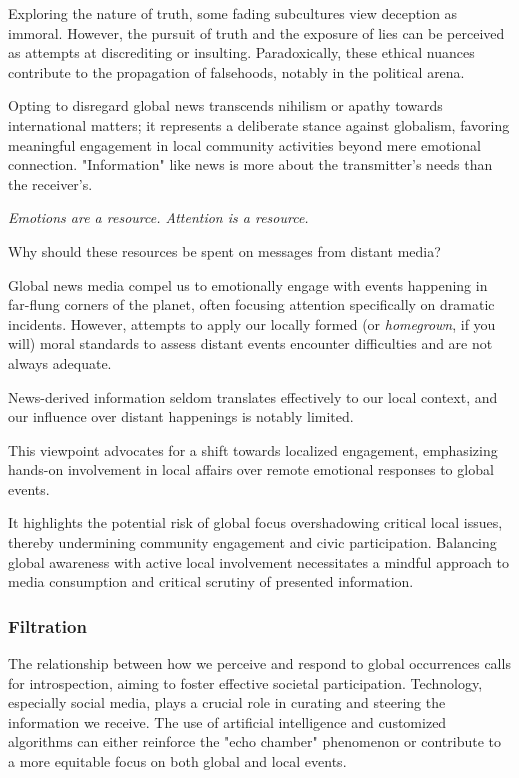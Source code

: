 \documentclass[11pt,a4]{article}
\begin{document}
    Exploring the nature of truth, some fading subcultures view deception as immoral. However, the pursuit of truth and the exposure of lies can be perceived as attempts at discrediting or insulting. Paradoxically, these ethical nuances contribute to the propagation of falsehoods, notably in the political arena.


    Opting to disregard global news transcends nihilism or apathy
    towards international matters; it represents a deliberate stance
    against globalism, favoring meaningful engagement in local community
    activities beyond mere emotional connection.    "Information" like
    news is  more about the transmitter's needs than the receiver's.

    \textit{Emotions are a resource. Attention is a resource.}

    Why should these resources be spent on messages from distant media?

    Global news media compel us to emotionally engage with events happening in far-flung corners of the planet, often focusing attention specifically on dramatic incidents. However, attempts to apply our locally formed (or \textit{homegrown}, if you will) moral standards to assess distant events encounter difficulties and are not always adequate.

    News-derived information seldom translates effectively to our
    local context, and our influence over distant happenings is notably limited.


    This viewpoint
    advocates for a shift towards localized engagement, emphasizing
    hands-on involvement in local affairs over remote
    emotional responses to global events.

  It highlights the potential risk of global focus overshadowing critical
    local issues, thereby undermining community engagement and civic participation.
    Balancing global awareness with active local involvement necessitates
    a mindful approach to media consumption and critical scrutiny of
    presented information.

    \subsubsection{Filtration}
    The relationship between how we perceive and respond to
    global occurrences calls for introspection, aiming to foster effective
    societal participation.   Technology, especially social media, plays a
    crucial role in curating and steering the information we receive. The
    use of artificial intelligence and customized algorithms can either
    reinforce the "echo chamber" phenomenon or contribute to a more equitable
    focus on both global and local events.
\end{document}
